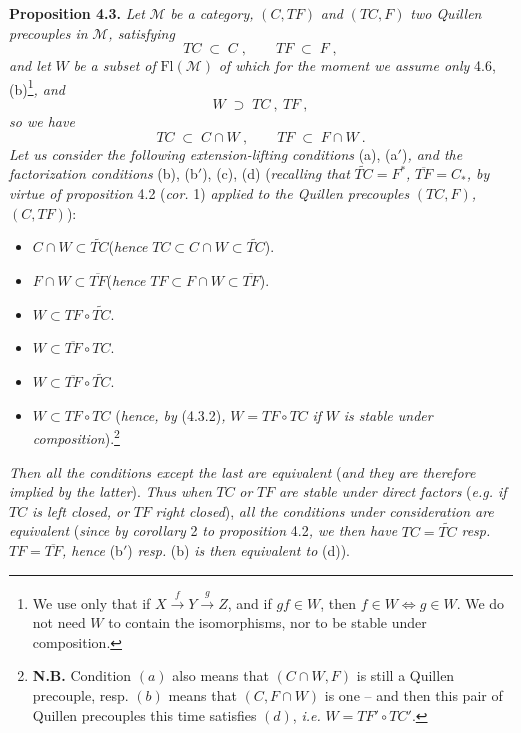 \documentclass[11pt]{article}
\newcommand{\msp}[1]{\marginpar{\footnotesize [#1]}}
\newcommand{\Fl}{\mathrm{Fl}}
\begin{document}
\textbf{Proposition 4.3.} \textit{Let} $\mathcal{M}$ \textit{be a category,} $(C,TF)$ \textit{and} $(TC,F)$ \textit{two Quillen precouples in} $\mathcal{M}$\textit{, satisfying}
\[
TC \;\subset\; C\;, \qquad TF \;\subset\; F\;,
\tag*{(4.3.1)}
\]
\textit{and let} $W$ \textit{be a subset of} $\Fl(\mathcal{M})$ \textit{of which for the moment we assume only} 4.6, (b)\footnote[10]{We use only that if $X\xrightarrow{\;f\;}Y\xrightarrow{\;g\;}Z$, and if $gf\in W$, then $f\in W\Longleftrightarrow g\in W$. We do not need $W$ to contain the isomorphisms, nor to be stable under composition.}\textit{, and} %
\[
W \;\supset\; TC\ ,\ TF\ ,
\tag*{(4.3.2)}
\]
\textit{so we have}
\[
TC \;\subset\; C\cap W\ , \qquad TF \;\subset\; F\cap W\ .
\tag*{(4.3.3)}
\]
\textit{Let us consider the following extension-lifting conditions} (a), (a$'$)\textit{, and the factorization conditions} (b), (b$'$), (c), (d) (\textit{recalling that} $\widetilde{TC}=F^*$\textit{,} $\overline{TF}=C_*$\textit{, by virtue of proposition} 4.2 (\textit{cor.} 1) \textit{applied to the Quillen precouples} $(TC,F)$\textit{,} $(C,TF)$):
\begin{itemize}[leftmargin=2.5em]
\item[a)] $C\cap W\subset\widetilde{TC}$\quad (\textit{hence} $TC\subset C\cap W\subset\widetilde{TC}$).
\item[a$'$)] $F\cap W\subset\overline{TF}$\quad (\textit{hence} $TF\subset F\cap W\subset\overline{TF}$).
\item[b)] $W\subset TF\circ\widetilde{TC}$.
\item[b$'$)] $W\subset\overline{TF}\circ TC$.
\item[c)] $W\subset\overline{TF}\circ\widetilde{TC}$.
\item[d)] $W\subset TF{\circ}TC$ (\textit{hence, by} (4.3.2)\textit{,} $W=TF{\circ}TC$ \textit{if} $W$ \textit{is stable under composition}).\footnote[11]{\textbf{N.B.} Condition $(a)$ also means that $(C\cap W,F)$ is still a Quillen precouple, resp. $(b)$ means that $(C,F\cap W)$ is one -- and then this pair of Quillen precouples this time satisfies $(d)$, \textit{i.e.} $W=TF'\circ TC'$.} %
\end{itemize}

\msp{page 33}
\textit{Then all the conditions except the last are equivalent} (\textit{and they are therefore implied by the latter}). \textit{Thus when} $TC$ \textit{or} $TF$ \textit{are stable under direct factors} (\textit{e.g. if} $TC$ \textit{is left closed, or} $TF$ \textit{right closed}), \textit{all the conditions under consideration are equivalent} (\textit{since by corollary} 2 \textit{to proposition} 4.2\textit{, we then have} $TC=\widetilde{TC}$ \textit{resp.} $TF=\overline{TF}$\textit{, hence} (b$'$) \textit{resp.} (b) \textit{is then equivalent to} (d)).
\end{document}
